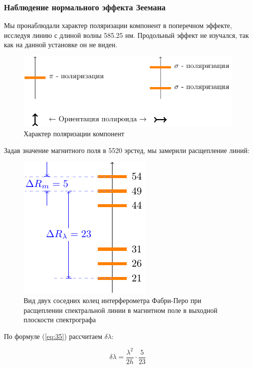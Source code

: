 \subsubsection{Наблюдение нормального эффекта Зеемана}

Мы пронаблюдали характер поляризации компонент в поперечном эффекте, исследуя линию с  длиной волны  585.25 нм. Продольный эффект не изучался, так как на данной установке он не виден.

\begin{figure}[H]
	\centering
	\includegraphics[scale=1]{ris/2a}
	\caption{Характер поляризации компонент}
	\label{fig:ris2a}
\end{figure}

Задав значение магнитного поля в 5520 эрстед, мы замерили расщепление линий:

\begin{figure}[H]
	\centering
	\includegraphics[scale=1]{ris/2b}
	\caption{Вид двух соседних колец интерферометра Фабри-Перо при расщеплении спектральной линии в магнитном поле в выходной плоскости спектрографа}
	\label{fig:ris2b}
\end{figure}

По формуле (\ref{eq:35}) рассчитаем $\delta\lambda$:

\begin{equation}
 	\delta \lambda=\frac{\lambda^2}{2h}\cdot\frac{5}{23}
 \end{equation} 

